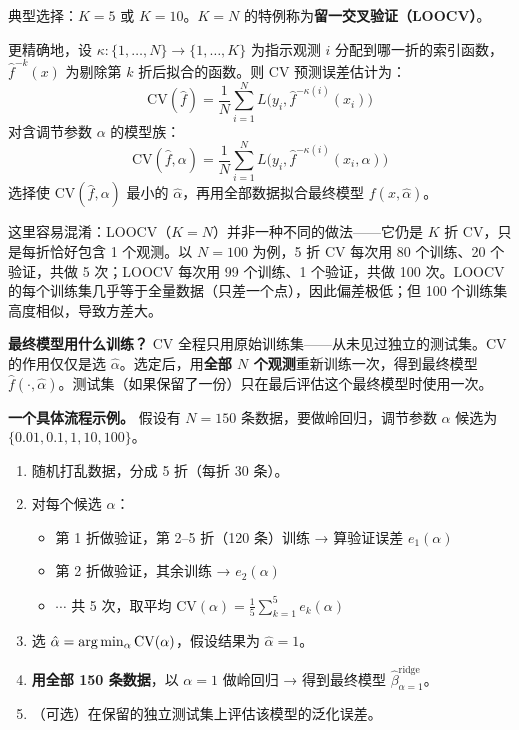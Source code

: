 典型选择：$K = 5$ 或 $K = 10$。$K = N$ 的特例称为\textbf{留一交叉验证（LOOCV）}。

更精确地，设 $\kappa: \{1,\ldots,N\} \to \{1,\ldots,K\}$ 为指示观测 $i$ 分配到哪一折的索引函数，$\hat{f}^{-k}(x)$ 为剔除第 $k$ 折后拟合的函数。则 CV 预测误差估计为：
\begin{equation}\label{eq:CV}
    \mathrm{CV}(\hat{f}) = \frac{1}{N}\sum_{i=1}^{N} L\bigl(y_i, \hat{f}^{-\kappa(i)}(x_i)\bigr)
\end{equation}
对含调节参数 $\alpha$ 的模型族：
\begin{equation}\label{eq:CV_alpha}
    \mathrm{CV}(\hat{f}, \alpha) = \frac{1}{N}\sum_{i=1}^{N} L\bigl(y_i, \hat{f}^{-\kappa(i)}(x_i, \alpha)\bigr)
\end{equation}
选择使 $\mathrm{CV}(\hat{f}, \alpha)$ 最小的 $\hat{\alpha}$，再用全部数据拟合最终模型 $f(x, \hat{\alpha})$。

这里容易混淆：LOOCV（$K=N$）并非一种不同的做法——它仍是 $K$ 折 CV，只是每折恰好包含 1 个观测。以 $N=100$ 为例，5 折 CV 每次用 80 个训练、20 个验证，共做 5 次；LOOCV 每次用 99 个训练、1 个验证，共做 100 次。LOOCV 的每个训练集几乎等于全量数据（只差一个点），因此偏差极低；但 100 个训练集高度相似，导致方差大。

\textbf{最终模型用什么训练？} CV 全程只用原始训练集——从未见过独立的测试集。CV 的作用仅仅是选 $\hat{\alpha}$。选定后，用\textbf{全部 $N$ 个观测}重新训练一次，得到最终模型 $\hat{f}(\cdot, \hat{\alpha})$。测试集（如果保留了一份）只在最后评估这个最终模型时使用一次。

\textbf{一个具体流程示例。} 假设有 $N=150$ 条数据，要做岭回归，调节参数 $\alpha$ 候选为 $\{0.01, 0.1, 1, 10, 100\}$。

\begin{enumerate}
    \item 随机打乱数据，分成 5 折（每折 30 条）。
    \item 对每个候选 $\alpha$：
    \begin{itemize}
        \item 第 1 折做验证，第 2--5 折（120 条）训练 → 算验证误差 $e_1(\alpha)$
        \item 第 2 折做验证，其余训练 → $e_2(\alpha)$
        \item $\cdots$ 共 5 次，取平均 $\mathrm{CV}(\alpha) = \frac{1}{5}\sum_{k=1}^{5} e_k(\alpha)$
    \end{itemize}
    \item 选 $\hat{\alpha} = \arg\min_\alpha \mathrm{CV}(\alpha)$，假设结果为 $\hat{\alpha}=1$。
    \item \textbf{用全部 150 条数据}，以 $\alpha=1$ 做岭回归 → 得到最终模型 $\hat{\beta}^{\text{ridge}}_{\alpha=1}$。
    \item （可选）在保留的独立测试集上评估该模型的泛化误差。
\end{enumerate}

